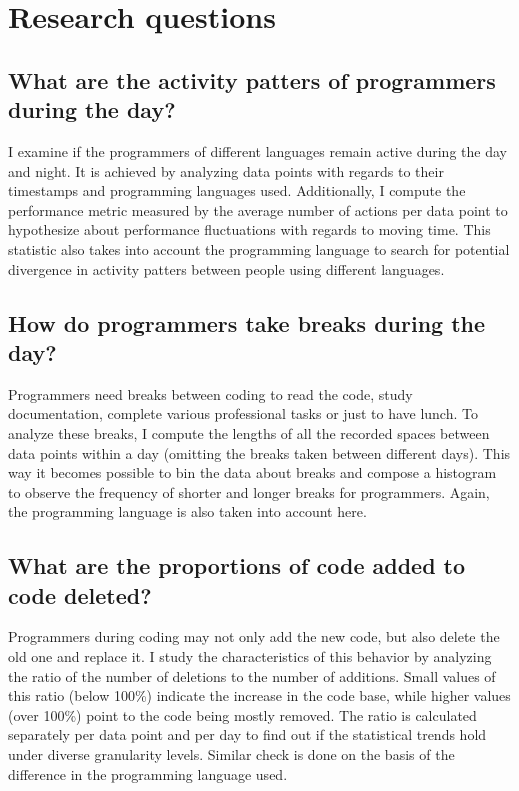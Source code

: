 \section{Research questions}

\subsection{What are the activity patters of programmers during the day?}

I examine if the programmers of different languages remain active during the day and night. It is achieved by analyzing data points with regards to their timestamps and programming languages used. Additionally, I compute the performance metric measured by the average number of actions per data point to hypothesize about performance fluctuations with regards to moving time. This statistic also takes into account the programming language to search for potential divergence in activity patters between people using different languages.

\subsection{How do programmers take breaks during the day?}

Programmers need breaks between coding to read the code, study documentation, complete various professional tasks or just to have lunch. To analyze these breaks, I compute the lengths of all the recorded spaces between data points within a day (omitting the breaks taken between different days). This way it becomes possible to bin the data about breaks and compose a histogram to observe the frequency of shorter and longer breaks for programmers. Again, the programming language is also taken into account here.

\subsection{What are the proportions of code added to code deleted?}

Programmers during coding may not only add the new code, but also delete the old one and replace it. I study the characteristics of this behavior by analyzing the ratio of the number of deletions to the number of additions. Small values of this ratio (below 100\%) indicate the increase in the code base, while higher values (over 100\%) point to the code being mostly removed. The ratio is calculated separately per data point and per day to find out if the statistical trends hold under diverse granularity levels. Similar check is done on the basis of the difference in the programming language used.


